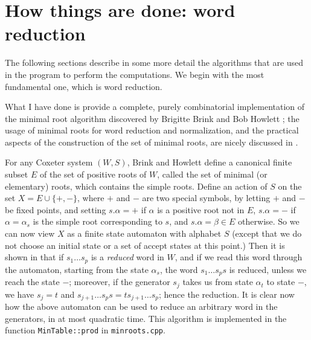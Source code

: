 \documentclass[11pt]{article}
\renewcommand{\a}{\alpha}
\renewcommand{\b}{\beta}
\begin{document}
\section{How things are done: word reduction}\label{section:reduction}

The following sections describe in some more detail the algorithms that are
used in the program to perform the computations. We begin with the most
fundamental one, which is word reduction.

What I have done is provide a complete, purely combinatorial implementation
of the minimal root algorithm discovered by Brigitte Brink and Bob Howlett
\cite{brink_howlett:1993}; the usage of minimal roots for word reduction
and normalization, and the practical aspects of the construction of the
set of minimal roots, are nicely discussed in \cite{casselman:2002}.

For any Coxeter system $(W,S)$, Brink and Howlett define a
canonical finite subset $E$ of the set of positive roots of $W$, called the
set of minimal (or elementary) roots, which contains the simple roots.
Define an action of $S$ on the set $X=E\cup\{+,-\}$, where $+$ and $-$ are
two special symbols, by letting $+$ and $-$ be fixed points, and setting
$s.\a=+$ if $\a$ is a positive root not in $E$, $s.\a=-$ if $\a=\a_s$ is
the simple root corresponding to $s$, and $s.\a=\b\in E$ otherwise. So
we can now view $X$ as a finite state automaton with alphabet $S$ (except
that we do not choose an initial state or a set of accept states at this
point.) Then it is shown in \cite{brink_howlett:1993} that if $s_1\ldots s_p$
is a {\em reduced} word in $W$, and if we read this word through the automaton,
starting from the state $\a_s$, the word $s_1\ldots s_ps$ is reduced, unless
we reach the state $-$; moreover, if the generator $s_j$ takes us from state
$\a_t$ to state $-$, we have $s_j=t$ and
$s_{j+1}\ldots s_ps=ts_{j+1}\ldots s_p$; hence the reduction. It is clear
now how the above automaton can be used to reduce an arbitrary word in
the generators, in at most quadratic time. This algorithm is implemented
in the function {\tt MinTable::prod} in {\tt minroots.cpp}.
\end{document}
